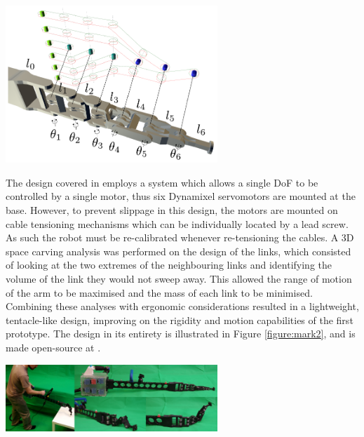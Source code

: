 \documentclass[11pt]{article}
\begin{document}
\begin{center}
\includegraphics[width = 0.6\textwidth]{links.png}
\label{figure:links}
\end{center}

The design covered in \cite{GreggSmithKinematics} employs a system which allows a single DoF to be controlled by a single motor, thus six Dynamixel servomotors are mounted at the base. However, to prevent slippage in this design, the motors are mounted on cable tensioning mechanisms which can be individually located by a lead screw. As such the robot must be re-calibrated whenever re-tensioning the cables. A 3D space carving analysis was performed on the design of the links, which consisted of looking at the two extremes of the neighbouring links and identifying the volume of the link they would not sweep away. This allowed the range of motion of the arm to be maximised and the mass of each link to be minimised. Combining these analyses with ergonomic considerations resulted in a lightweight, tentacle-like design, improving on the rigidity and motion capabilities of the first prototype. The design in its entirety is illustrated in Figure \ref{figure:mark2}, and is made open-source at \cite{handheldrobotics}.

\begin{center}
\includegraphics[width = 0.6\textwidth]{mark2.png}
\label{figure:mark2}
\end{center}
\end{document}
